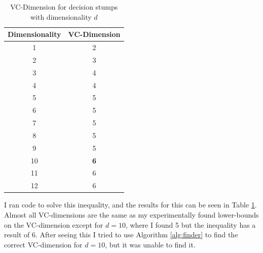 \documentclass[11pt,a4paper]{article}
\begin{document}
\begin{table}
    \centering
    \begin{tabular}{|c|c|}
    \hline
    Dimensionality & VC-Dimension \\ \hline
    1              & 2                        \\ \hline
    2              & 3                           \\ \hline
    3              & 4                         \\ \hline
    4              & 4                            \\ \hline
    5              & 5                            \\ \hline
    6              &    5                         \\ \hline
    7              & 5                           \\ \hline
    8              & 5                            \\ \hline
    9              & 5                            \\ \hline
    10              & \textbf{6}                            \\ \hline
    11             &  6                          \\ \hline
    12              &  6                           \\ \hline
    \end{tabular}
    \caption{VC-Dimension for decision stumps with dimensionality $d$}
    \label{tab:vc-dimension}
\end{table}

I ran code to solve this inequality, and the results for this can be seen in Table \ref{tab:vc-dimension}. Almost all VC-dimensions are the same as my experimentally found lower-bounds on the VC-dimension except for $d=10$, where I found 5 but the inequality has a result of 6. After seeing this I tried to use Algorithm \ref{alg:finder} to find the correct VC-dimension for $d=10$, but it was unable to find it.





\end{document}
